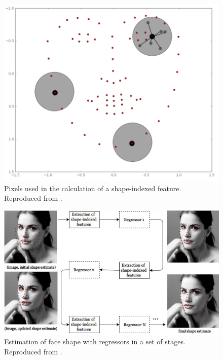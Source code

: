 \begin{figure}[h]
    \centering
    \includegraphics[width=0.6\linewidth]{Content/figures/shape-indexed.png}
    \caption{Pixels used in the calculation of a shape-indexed feature. Reproduced from \textcite{maris2015}.}
    \label{fig:shape-indexed}
\end{figure}

\begin{figure}[h]
    \centering
    \includegraphics[width=1.0\linewidth]{Content/figures/cascade-explanation.png}
    \caption{Estimation of face shape with regressors in a set of stages. Reproduced from \textcite{maris2015}.}
    \label{fig:regressor-steps}
\end{figure}

